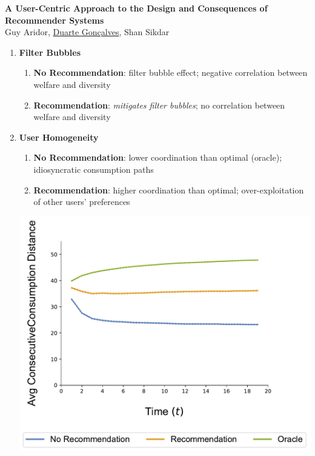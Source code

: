 \documentclass[8pt, aspectratio=43,usenames,dvipsnames]{beamer} %
\begin{document}
{\begin{frame}
\begin{center}
\textbf{\color{titleblue}A User-Centric Approach to the Design and Consequences of Recommender Systems}\\
Guy Aridor, \underline{Duarte Gon\c{c}alves}, Shan Sikdar
\end{center}
\begin{enumerate}
\itemsep=1.5em
\setlength{\itemindent}{-1.25em}
\item \textbf{Filter Bubbles}
	\begin{enumerate}
	\vspace{.5em}
	\itemsep=.8em
	\setlength{\itemindent}{-3em}
	\normalsize
	\item \textbf{\color{mycolor1}No Recommendation}: filter bubble effect; negative correlation between welfare and diversity
	\item \textbf{\color{mycolor2}Recommendation}: \textit{mitigates filter bubbles}; no correlation between welfare and diversity
	\end{enumerate}
\item \textbf{User Homogeneity}
	\begin{enumerate}
	\vspace{.5em}
	\itemsep=.8em
	\setlength{\itemindent}{-3em}
	\normalsize
	\item \textbf{\color{mycolor1}No Recommendation}: lower coordination than {\color{mycolor3}optimal} ({\color{mycolor3}oracle}); idiosyncratic consumption paths 
	\item \textbf{\color{mycolor2}Recommendation}: higher coordination than {\color{mycolor3}optimal}; over-exploitation of other users' preferences
	\end{enumerate}
\begin{minipage}{.47\textwidth}
\centering
\includegraphics[width=\textwidth]{rho_pos_consumption_dist_N_200T_20_overall.pdf}

\end{minipage}
\end{enumerate}
\end{frame}}
\end{document}
